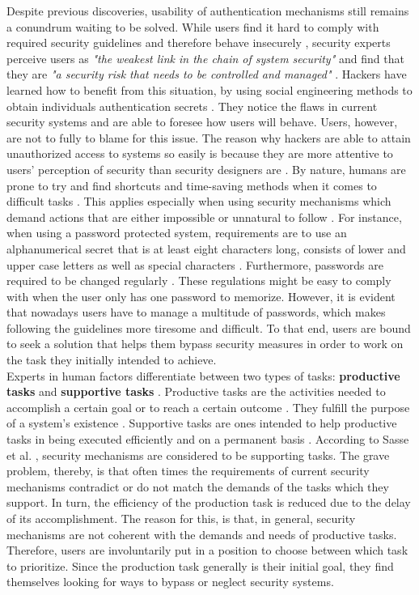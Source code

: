 Despite previous discoveries, usability of authentication mechanisms still remains a conundrum waiting to be solved. While users find it hard to comply with required security guidelines and therefore behave insecurely \cite{Adams:1999:UE:322796.322806, sasse}, security experts perceive users as \textit{"the weakest link in the chain of system security"} \cite{sasse} and find that they are \textit{"a security risk that needs to be controlled and managed"}  \cite{Adams:1999:UE:322796.322806}. Hackers have learned how to benefit from this situation, by using social engineering methods to obtain individuals authentication secrets \cite{Adams:1999:UE:322796.322806, sasse}. They notice the flaws in current security systems and are able to foresee how users will behave. Users, however, are not to fully to blame for this issue. The reason why hackers are able to attain unauthorized access to systems so easily is because they are more attentive to users' perception of security than security designers are \cite{Adams:1999:UE:322796.322806}. By nature, humans are prone to try and find shortcuts and time-saving methods when it comes to difficult tasks \cite{sasse}. This applies especially when using security mechanisms which demand actions that are either impossible or unnatural to follow \cite{sasse}. For instance, when using a password protected system, requirements are to use an alphanumerical secret that is at least eight characters long, consists of lower and upper case letters as well as special characters \cite{payne, sasse}. Furthermore, passwords are required to be changed regularly \cite{adams2,gorman}. These regulations might be easy to comply with when the user only has one password to memorize. However, it is evident that nowadays users have to manage a multitude of passwords, which makes following the guidelines more tiresome and difficult. To that end, users are bound to seek a solution that helps them bypass security measures in order to work on the task they initially intended to achieve. \\

Experts in human factors differentiate between two types of tasks: \textbf{productive tasks} and \textbf{supportive tasks} \cite{sasse}. Productive tasks are the activities needed to accomplish a certain goal or to reach a certain outcome \cite{sasse}. They fulfill the purpose of a system's existence \cite{sasse}. Supportive tasks are ones intended to help productive tasks in being executed efficiently and on a permanent basis \cite{sasse}. According to Sasse et al. \cite{sasse}, security mechanisms are considered to be supporting tasks. The grave problem, thereby, is that often times the requirements of current security mechanisms contradict or do not match the demands of the tasks which they support. In turn, the efficiency of the production task is reduced due to the delay of its accomplishment. The reason for this, is that, in general, security mechanisms are not coherent with the demands and needs of productive tasks. Therefore, users are involuntarily put in a position to choose between which task to prioritize. Since the production task generally is their initial goal, they find themselves looking for ways to bypass or neglect security systems. \\


